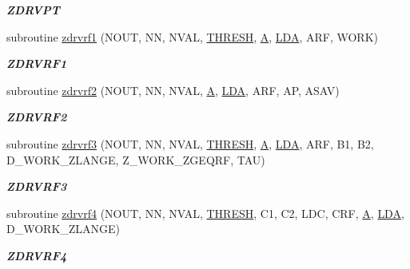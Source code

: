 \begin{DoxyCompactItemize}
\begin{DoxyCompactList}\small\item\em {\bfseries Z\+D\+R\+V\+P\+T} \end{DoxyCompactList}\item 
subroutine \hyperlink{group__complex16__lin_ga5fa3493223ae5f2842a7e8c63791f0e5}{zdrvrf1} (N\+O\+U\+T, N\+N, N\+V\+A\+L, \hyperlink{zlaqgs_8c_a0656018abfc9fa2821827415f5d5ea57}{T\+H\+R\+E\+S\+H}, \hyperlink{classA}{A}, \hyperlink{example__user_8c_ae946da542ce0db94dced19b2ecefd1aa}{L\+D\+A}, A\+R\+F, W\+O\+R\+K)
\begin{DoxyCompactList}\small\item\em {\bfseries Z\+D\+R\+V\+R\+F1} \end{DoxyCompactList}\item 
subroutine \hyperlink{group__complex16__lin_gaceac78f76cffa751021745ead52af790}{zdrvrf2} (N\+O\+U\+T, N\+N, N\+V\+A\+L, \hyperlink{classA}{A}, \hyperlink{example__user_8c_ae946da542ce0db94dced19b2ecefd1aa}{L\+D\+A}, A\+R\+F, A\+P, A\+S\+A\+V)
\begin{DoxyCompactList}\small\item\em {\bfseries Z\+D\+R\+V\+R\+F2} \end{DoxyCompactList}\item 
subroutine \hyperlink{group__complex16__lin_gab3f02d272b3c8a21b67d6bfb3ae5ffb4}{zdrvrf3} (N\+O\+U\+T, N\+N, N\+V\+A\+L, \hyperlink{zlaqgs_8c_a0656018abfc9fa2821827415f5d5ea57}{T\+H\+R\+E\+S\+H}, \hyperlink{classA}{A}, \hyperlink{example__user_8c_ae946da542ce0db94dced19b2ecefd1aa}{L\+D\+A}, A\+R\+F, B1, B2, D\+\_\+\+W\+O\+R\+K\+\_\+\+Z\+L\+A\+N\+G\+E, Z\+\_\+\+W\+O\+R\+K\+\_\+\+Z\+G\+E\+Q\+R\+F, T\+A\+U)
\begin{DoxyCompactList}\small\item\em {\bfseries Z\+D\+R\+V\+R\+F3} \end{DoxyCompactList}\item 
subroutine \hyperlink{group__complex16__lin_ga46d62d752089745257463056e41a8ef0}{zdrvrf4} (N\+O\+U\+T, N\+N, N\+V\+A\+L, \hyperlink{zlaqgs_8c_a0656018abfc9fa2821827415f5d5ea57}{T\+H\+R\+E\+S\+H}, C1, C2, L\+D\+C, C\+R\+F, \hyperlink{classA}{A}, \hyperlink{example__user_8c_ae946da542ce0db94dced19b2ecefd1aa}{L\+D\+A}, D\+\_\+\+W\+O\+R\+K\+\_\+\+Z\+L\+A\+N\+G\+E)
\begin{DoxyCompactList}\small\item\em {\bfseries Z\+D\+R\+V\+R\+F4} \end{DoxyCompactList}\item 

\end{DoxyCompactItemize}
